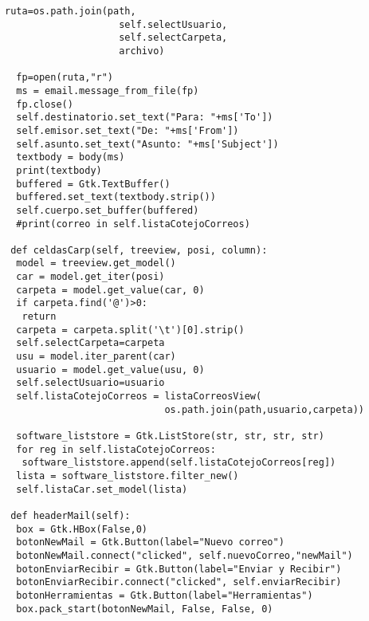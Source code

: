 \begin{lstlisting}[frame=single]
  ruta=os.path.join(path, 
                    self.selectUsuario, 
                    self.selectCarpeta, 
                    archivo)

  fp=open(ruta,"r")
  ms = email.message_from_file(fp)
  fp.close()
  self.destinatorio.set_text("Para: "+ms['To'])
  self.emisor.set_text("De: "+ms['From'])
  self.asunto.set_text("Asunto: "+ms['Subject'])
  textbody = body(ms)
  print(textbody)
  buffered = Gtk.TextBuffer()
  buffered.set_text(textbody.strip())
  self.cuerpo.set_buffer(buffered)
  #print(correo in self.listaCotejoCorreos)

 def celdasCarp(self, treeview, posi, column):
  model = treeview.get_model()
  car = model.get_iter(posi)
  carpeta = model.get_value(car, 0)
  if carpeta.find('@')>0:
   return
  carpeta = carpeta.split('\t')[0].strip()
  self.selectCarpeta=carpeta
  usu = model.iter_parent(car)
  usuario = model.get_value(usu, 0)
  self.selectUsuario=usuario
  self.listaCotejoCorreos = listaCorreosView(
                            os.path.join(path,usuario,carpeta))
                            
  software_liststore = Gtk.ListStore(str, str, str, str)
  for reg in self.listaCotejoCorreos: 
   software_liststore.append(self.listaCotejoCorreos[reg])
  lista = software_liststore.filter_new()
  self.listaCar.set_model(lista)

 def headerMail(self):
  box = Gtk.HBox(False,0)
  botonNewMail = Gtk.Button(label="Nuevo correo")
  botonNewMail.connect("clicked", self.nuevoCorreo,"newMail")
  botonEnviarRecibir = Gtk.Button(label="Enviar y Recibir")
  botonEnviarRecibir.connect("clicked", self.enviarRecibir)
  botonHerramientas = Gtk.Button(label="Herramientas")
  box.pack_start(botonNewMail, False, False, 0)
\end{lstlisting}
